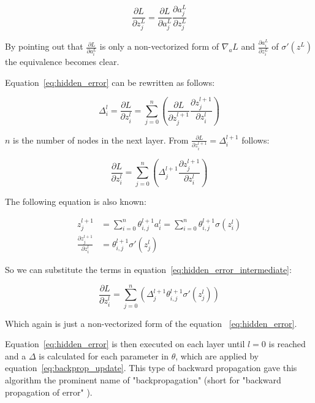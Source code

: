 \begin{equation}
    \frac{\partial L}{\partial z^L_j} = \frac{\partial L}{\partial a^L_j}\frac{\partial a^L_j}{\partial z^L_j}
    \label{eq:proof_loss_chain_rule}
\end{equation}

By pointing out that $\frac{\partial L}{\partial a^L_i}$ is only a non-vectorized form of $\nabla_a L$ and $\frac{\partial a^L_i}{\partial z^L_i}$ of $\sigma'(z^L)$ the equivalence becomes clear.

Equation~\eqref{eq:hidden_error} can be rewritten as follows:

\begin{equation}
    \varDelta^l_i = \frac{\partial L}{\partial z^l_i} = \sum_{j=0}^n (\frac{\partial L}{\partial z^{l+1}_j}\frac{\partial z^{l+1}_j}{\partial z^l_i})
\end{equation}

$n$ is the number of nodes in the next layer. From $\frac{\partial L}{\partial z^{l+1}_i} = \varDelta^{l+1}_i$ follows:

\begin{equation}
    \frac{\partial L}{\partial z^l_i} = \sum_{j=0}^n (\varDelta^{l+1}_j \frac{\partial z^{l+1}_j}{\partial z^{l}_i})
    \label{eq:hidden_error_intermediate}
\end{equation}

The following equation is also known:

\begin{equation}
    \begin{split}
    z^{l+1}_j & = \sum_{i=0}^n \theta^{l+1}_{i,j} a^l_i = \sum_{i=0}^n \theta^{l+1}_{i, j} \sigma(z^l_i) \\
    \frac{\partial z_j^{l+1}}{\partial z_i^l} & = \theta^{l+1}_{i,j} \sigma'(z^l_j)
    \end{split}
\end{equation}

So we can substitute the terms in equation~\eqref{eq:hidden_error_intermediate}:

\begin{equation}
    \frac{\partial L}{\partial z^l_i} = \sum_{j=0}^n (\varDelta^{l+1}_j \theta^{l+1}_{i,j} \sigma'(z_j^l))
\end{equation}

Which again is just a non-vectorized form of the equation ~\eqref{eq:hidden_error}.

Equation~\eqref{eq:hidden_error} is then executed on each layer until $l=0$ is reached and a $\varDelta$ is calculated for each parameter in $\theta$, which are applied by equation~\eqref{eq:backprop_update}.
This type of backward propagation gave this algorithm the prominent name of "backpropagation" (short for "backward propagation of error" \cite{Rumelhart1986}).

